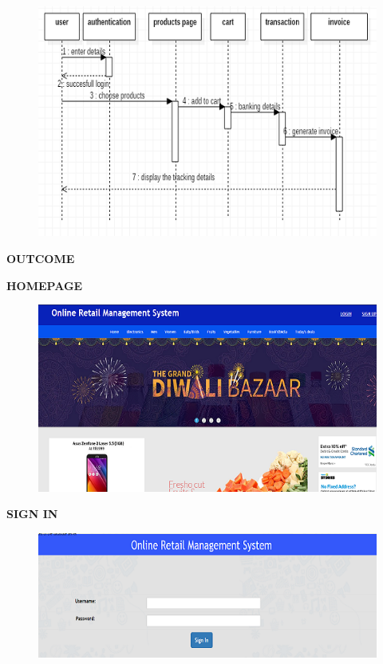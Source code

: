 \documentclass{tcc}
\begin{document}
\begin{figure}[H]
\centering
\includegraphics{images/addingtocartseq.PNG}\\
\end{figure}
\begin{center}
\textbf{\Large{OUTCOME}}
\end{center}
\begin{center}
\textbf{\Large{HOMEPAGE}}
\end{center}
\begin{figure}[H]
\centering
\includegraphics{images/sc1.PNG}\\
\end{figure}
\newpage
\begin{center}
\textbf{\Large{SIGN IN}}
\end{center}
\begin{figure}[H]
\centering
\includegraphics{images/sc2.PNG}\\
\end{figure}
\end{document}
